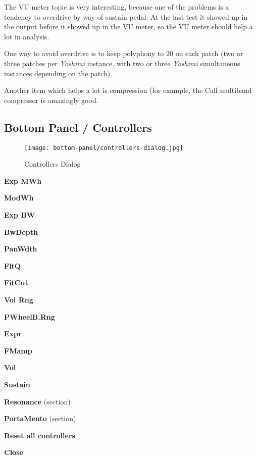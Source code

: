    The VU meter topic is very interesting, because one of the problems
   is a tendency to overdrive by way of sustain pedal.  At the last test it
   showed up in the output before it showed up in the VU meter, so
   the VU meter should help a lot in analysis.

   One way to avoid overdrive is to keep polyphony to 20 on each patch (two
   or three patches per \textsl{Yoshimi} instance, with two or three
   \textsl{Yoshimi} simultaneous instances depending on the patch).

   Another item which helps a lot is compression (for example, the Calf
   multiband compressor is amazingly good.

\subsection{Bottom Panel / Controllers}
\label{subsec:bottom_panel_controllers}

\begin{figure}[H]
   \centering 
   \texttt{[image: bottom-panel/controllers-dialog.jpg]}
   \caption{Controllers Dialog}
   \label{fig:controllers_dialog}
\end{figure}

   \begin{enumber}
      \item \textbf{Exp MWh}
      \item \textbf{ModWh}
      \item \textbf{Exp BW}
      \item \textbf{BwDepth}
      \item \textbf{PanWdth}
      \item \textbf{FltQ}
      \item \textbf{FitCut}
      \item \textbf{Vol Rng}
      \item \textbf{PWheelB.Rng}
      \item \textbf{Expr}
      \item \textbf{FMamp}
      \item \textbf{Vol}
      \item \textbf{Sustain}
      \item \textbf{Resonance} (section)
      \item \textbf{PortaMento} (section)
      \item \textbf{Reset all controllers}
      \item \textbf{Close}
   \end{enumber}

